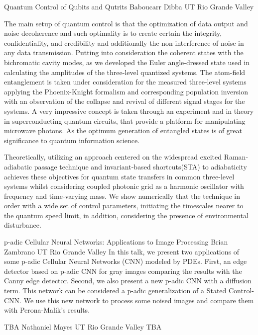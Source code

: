 \vspace{1.5ex}
\abs
{Quantum Control of Qubits and Qutrits}
{Baboucarr Dibba}
{UT Rio Grande Valley}
{The main setup of quantum control is that the optimization of data output and noise 
decoherence and such optimality is to create certain the integrity, confidentiality, and
credibility and additionally the non-interference of noise in any data transmission.
Putting into consideration the coherent states with the bichromatic cavity modes,
as we developed the Euler angle-dressed state used in calculating the amplitudes
of the three-level quantized systems. The atom-field entanglement is taken under
consideration for the measured three-level systems applying the Phoenix-Knight
formalism and corresponding population inversion with an observation of the collapse
and revival of different signal stages for the systems. A very impressive concept is
taken through an experiment and in theory in superconducting quantum circuits, that
provide a platform for manipulating microwave photons. As the optimum generation of
entangled states is of great significance to quantum information science.

Theoretically, utilizing an approach centered on the widespread excited Raman-adiabatic passage
technique and invariant-based shortcuts(STA) to adiabaticity achieves these objectives for quantum state transfers in common three-level systems whilst considering coupled photonic grid as a harmonic oscillator with frequency and time-varying mass. We show numerically that the technique in order with a wide set of control
parameters, initiating the timescales nearer to the quantum speed limit, in addition,
considering the presence of environmental disturbance.}


\vspace{1.5ex}
\abs
{p-adic Cellular Neural Networks: Applications to Image Processing}
{Brian Zambrano}
{UT Rio Grande Valley}
{In this talk, we present two applications of some p-adic Cellular Neural Networks (CNN) modeled by PDEs. First, an edge detector based on p-adic CNN for gray images comparing the results with the Canny edge detector. Second, we also present a new p-adic CNN with a diffusion term. This network can be considered a p-adic generalization of a Stated Control- CNN.   We use this new network to process some noised images and compare them with Perona-Malik’s results.}


\vspace{1.5ex}
\abs
{TBA}
{Nathaniel Mayes}
{UT Rio Grande Valley}
{TBA}




